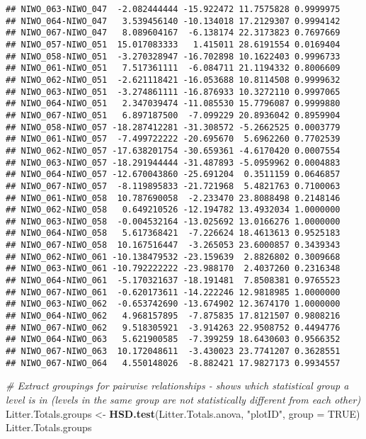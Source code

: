 \documentclass[
]{article}
\newenvironment{Shaded}{\begin{snugshade}}{\end{snugshade}}
\newcommand{\CommentTok}[1]{\textcolor[rgb]{0.56,0.35,0.01}{\textit{#1}}}
\newcommand{\DataTypeTok}[1]{\textcolor[rgb]{0.13,0.29,0.53}{#1}}
\newcommand{\KeywordTok}[1]{\textcolor[rgb]{0.13,0.29,0.53}{\textbf{#1}}}
\newcommand{\NormalTok}[1]{#1}
\newcommand{\OtherTok}[1]{\textcolor[rgb]{0.56,0.35,0.01}{#1}}
\newcommand{\StringTok}[1]{\textcolor[rgb]{0.31,0.60,0.02}{#1}}
\begin{document}
\begin{verbatim}
## NIWO_063-NIWO_047  -2.082444444 -15.922472 11.7575828 0.9999975
## NIWO_064-NIWO_047   3.539456140 -10.134018 17.2129307 0.9994142
## NIWO_067-NIWO_047   8.089604167  -6.138174 22.3173823 0.7697669
## NIWO_057-NIWO_051  15.017083333   1.415011 28.6191554 0.0169404
## NIWO_058-NIWO_051  -3.270328947 -16.702898 10.1622403 0.9996733
## NIWO_061-NIWO_051   7.517361111  -6.084711 21.1194332 0.8006609
## NIWO_062-NIWO_051  -2.621118421 -16.053688 10.8114508 0.9999632
## NIWO_063-NIWO_051  -3.274861111 -16.876933 10.3272110 0.9997065
## NIWO_064-NIWO_051   2.347039474 -11.085530 15.7796087 0.9999880
## NIWO_067-NIWO_051   6.897187500  -7.099229 20.8936042 0.8959904
## NIWO_058-NIWO_057 -18.287412281 -31.308572 -5.2662525 0.0003779
## NIWO_061-NIWO_057  -7.499722222 -20.695670  5.6962260 0.7702539
## NIWO_062-NIWO_057 -17.638201754 -30.659361 -4.6170420 0.0007554
## NIWO_063-NIWO_057 -18.291944444 -31.487893 -5.0959962 0.0004883
## NIWO_064-NIWO_057 -12.670043860 -25.691204  0.3511159 0.0646857
## NIWO_067-NIWO_057  -8.119895833 -21.721968  5.4821763 0.7100063
## NIWO_061-NIWO_058  10.787690058  -2.233470 23.8088498 0.2148146
## NIWO_062-NIWO_058   0.649210526 -12.194782 13.4932034 1.0000000
## NIWO_063-NIWO_058  -0.004532164 -13.025692 13.0166276 1.0000000
## NIWO_064-NIWO_058   5.617368421  -7.226624 18.4613613 0.9525183
## NIWO_067-NIWO_058  10.167516447  -3.265053 23.6000857 0.3439343
## NIWO_062-NIWO_061 -10.138479532 -23.159639  2.8826802 0.3009668
## NIWO_063-NIWO_061 -10.792222222 -23.988170  2.4037260 0.2316348
## NIWO_064-NIWO_061  -5.170321637 -18.191481  7.8508381 0.9765523
## NIWO_067-NIWO_061  -0.620173611 -14.222246 12.9818985 1.0000000
## NIWO_063-NIWO_062  -0.653742690 -13.674902 12.3674170 1.0000000
## NIWO_064-NIWO_062   4.968157895  -7.875835 17.8121507 0.9808216
## NIWO_067-NIWO_062   9.518305921  -3.914263 22.9508752 0.4494776
## NIWO_064-NIWO_063   5.621900585  -7.399259 18.6430603 0.9566352
## NIWO_067-NIWO_063  10.172048611  -3.430023 23.7741207 0.3628551
## NIWO_067-NIWO_064   4.550148026  -8.882421 17.9827173 0.9934557
\end{verbatim}

\begin{Shaded}
\begin{Highlighting}[]
\CommentTok{# Extract groupings for pairwise relationships - shows which statistical group a level is in (levels in the same group are not statistically different from each other)}
\NormalTok{Litter.Totals.groups <-}\StringTok{ }\KeywordTok{HSD.test}\NormalTok{(Litter.Totals.anova, }\StringTok{"plotID"}\NormalTok{, }\DataTypeTok{group =} \OtherTok{TRUE}\NormalTok{)}
\NormalTok{Litter.Totals.groups}
\end{Highlighting}
\end{Shaded}
\end{document}
